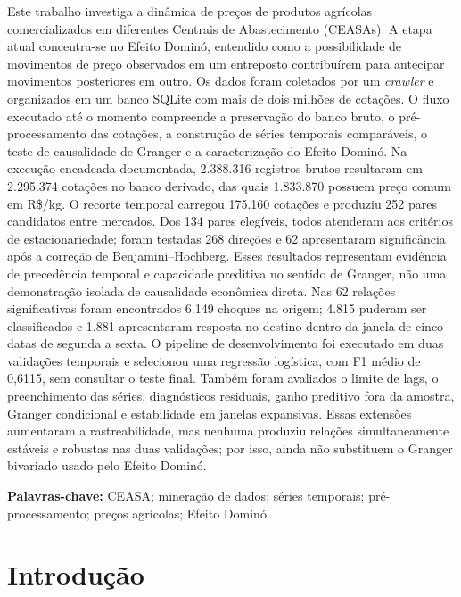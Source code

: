 \documentclass[12pt,a4paper]{article}
\begin{document}
Este trabalho investiga a dinâmica de preços de produtos agrícolas
comercializados em diferentes Centrais de Abastecimento (CEASAs). A etapa atual
concentra-se no Efeito Dominó, entendido como a possibilidade de movimentos de
preço observados em um entreposto contribuírem para antecipar movimentos
posteriores em outro. Os dados foram coletados por um \textit{crawler} e
organizados em um banco SQLite com mais de dois milhões de cotações. O fluxo
executado até o momento compreende a preservação do banco bruto, o
pré-processamento das cotações, a construção de séries temporais comparáveis,
o teste de causalidade de Granger e a caracterização do Efeito Dominó. Na
execução encadeada documentada, 2.388.316 registros
brutos resultaram em 2.295.374 cotações no banco derivado, das quais 1.833.870
possuem preço comum em R\$/kg. O recorte temporal carregou 175.160 cotações e
produziu 252 pares candidatos entre mercados. Dos 134 pares elegíveis, todos
atenderam aos critérios de estacionariedade; foram testadas 268 direções e 62
apresentaram significância após a correção de Benjamini--Hochberg. Esses
resultados representam evidência de precedência temporal e capacidade
preditiva no sentido de Granger, não uma demonstração isolada de causalidade
econômica direta. Nas 62 relações significativas foram encontrados 6.149
choques na origem; 4.815 puderam ser classificados e 1.881 apresentaram
resposta no destino dentro da janela de cinco datas de segunda a sexta. O
pipeline de desenvolvimento foi executado em duas validações temporais e
selecionou uma regressão logística, com F1 médio de 0,6115, sem consultar o
teste final. Também foram avaliados o limite de lags, o preenchimento das
séries, diagnósticos residuais, ganho preditivo fora da amostra, Granger
condicional e estabilidade em janelas expansivas. Essas extensões aumentaram a
rastreabilidade, mas nenhuma produziu relações simultaneamente estáveis e
robustas nas duas validações; por isso, ainda não substituem o Granger
bivariado usado pelo Efeito Dominó.

\noindent\textbf{Palavras-chave:} CEASA; mineração de dados; séries temporais;
pré-processamento; preços agrícolas; Efeito Dominó.


\section{Introdução}
\end{document}

